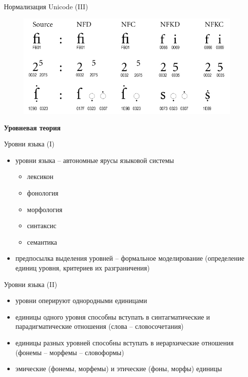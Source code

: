\documentclass{beamer}
\begin{document}
\begin{frame}{Нормализация Unicode (III)}
\begin{figure}[H]
\includegraphics[scale=0.4]{normalized.png} 
\end{figure}
\end{frame}

 
 
 
 

\begin{frame}{}
\begin{center}
	\textbf{Уровневая теория}
\end{center}
\end{frame}

\begin{frame}{Уровни языка (I)}
\setcounter{framenumber}{1}
\begin{itemize}
    \item уровни языка -- автономные ярусы языковой системы
    	\begin{itemize}
			\item лексикон
			\item фонология
			\item морфология
			\item синтаксис
			\item семантика    	
    	\end{itemize}
	\item предпосылка выделения уровней -- формальное моделирование (определение единиц уровня, критериев их разграничения)    	
\end{itemize}
\end{frame}

\begin{frame}{Уровни языка (II)}
\begin{itemize}
	\item уровни оперируют однородными единицами
	\item единицы одного уровня способны вступать в синтагматические и парадигматические отношения (слова -- словосочетания)
	\item единицы разных уровней способны вступать в иерархические отношения (фонемы -- морфемы -- словоформы)
	\item эмические (фонемы, морфемы) и этические (фоны, морфы) единицы 
\end{itemize}
\end{frame}
\end{document}
